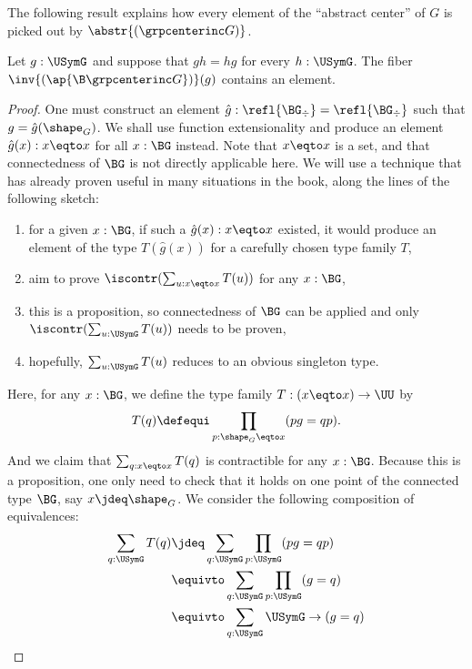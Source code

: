 The following result explains how every element of the ``abstract
center'' of $G$ is picked out by $\abstr{(\grpcenterinc G)}$.
\begin{lemma}
  \label{lemma:center-inc-surj-on-paths}%
  Let $g:\USymG$ and suppose that $gh=hg$ for every
  $h:\USymG$. The fiber $\inv{(\ap {\B\grpcenterinc G})}(g)$ contains
  an element.
\end{lemma}
\begin{proof}
  One must construct an element $\hat g:\refl{\BG_\div} = \refl{\BG_\div}$ such
  that $g=\hat g(\shape_G)$. We shall use function extensionality and produce an
  element $\hat g(x):x\eqto x$ for all $x:\BG$ instead. Note that $x\eqto x$ is
  a set, and that connectedness of $\BG$ is not directly applicable here. We
  will use a technique that has already proven useful in many situations in the
  book, along the lines of the following sketch:
  \begin{enumerate}
  \item for a given $x:\BG$, if such a $\hat g(x):x\eqto x$ existed, it would
    produce an element of the type $T(\hat g(x))$ for a carefully chosen type
    family $T$,
  \item aim to prove $\iscontr(\sum_{u:x\eqto x}T(u))$ for any $x:\BG$,
  \item this is a proposition, so connectedness of $\BG$ can be applied
    and only $\iscontr(\sum_{u:\USymG}T(u))$ needs to be proven,
  \item hopefully, $\sum_{u:\USymG}T(u)$ reduces to an obvious
    singleton type.
  \end{enumerate}
  Here, for any $x:\BG$, we define the type family $T: (x\eqto x) \to \UU$
  by
  \begin{displaymath}
    T(q) \defequi \prod_{p:\shape_G\eqto x} (pg=qp).
  \end{displaymath}
  And we claim that $\sum_{q:x\eqto x}T(q)$ is contractible for any
  $x:\BG$. Because this is a proposition, one only need to check that it holds
  on one point of the connected type $\BG$, say $x\jdeq \shape_G$. We consider
  the following composition of equivalences:
  \begin{displaymath}%
    \begin{aligned}
      \sum_{q:\USymG}T(q) &\jdeq
      \sum_{q:\USymG}\prod_{p:\USymG}(pg=qp)
      \\
      &\equivto \sum_{q:\USymG}\prod_{p:\USymG}(g=q)
      \\
      &\equivto \sum_{q:\USymG}\USymG\to (g=q)
      \\

\end{aligned}
\end{displaymath}
\end{proof}
